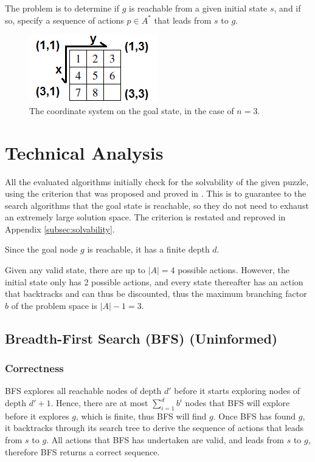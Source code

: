 \documentclass[runningheads]{llncs}
\begin{document}
The problem is to determine if $g$ is reachable from a given initial state $s$, and if so, specify a sequence of actions $p \in A^\ast$ that leads from $s$ to $g$.



\begin{figure}
	\centering
	\includegraphics{coord_system.png}
	\caption{The coordinate system on the goal state, in the case of $n=3$.} \label{fig:coordsystem}
\end{figure}



\section{Technical Analysis}
All the evaluated algorithms initially check for the solvability of the given puzzle, using the criterion that was proposed and proved in \cite{Solvability}. This is to guarantee to the search algorithms that the goal state is reachable, so they do not need to exhaust an extremely large solution space.
The criterion is restated and reproved in Appendix \ref{subsec:solvability}.

Since the goal node $g$ is reachable, it has a finite depth $d$.

Given any valid state, there are up to $|A|=4$ possible actions. However, the initial state only has 2 possible actions, and every state thereafter has an action that backtracks and can thus be discounted, thus the maximum branching factor $b$ of the problem space is $|A|-1=3$.

\subsection{Breadth-First Search (BFS) (Uninformed)}
\subsubsection{Correctness}
BFS explores all reachable nodes of depth $d'$ before it starts exploring nodes of depth $d'+1$. Hence, there are at most $\sum_{i=1}^d b^i$ nodes that BFS will explore before it explores $g$, which is finite, thus BFS will find $g$. Once BFS has found $g$, it backtracks through its search tree to derive the sequence of actions that leads from $s$ to $g$. All actions that BFS has undertaken are valid, and leads from $s$ to $g$, therefore BFS returns a correct sequence.
\end{document}
